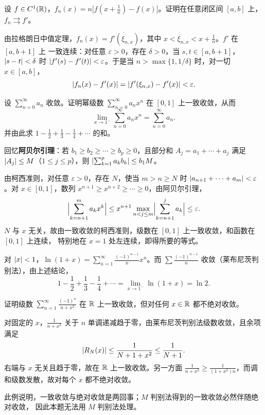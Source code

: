 \documentclass{mojing-exercise}
\begin{document}
\begin{problem}[difficulty=2, space=4.5cm]
设 $f\in C^1(\R)$，$f_n(x)=n\bigl[f(x+\tfrac1n)-f(x)\bigr]$。证明在任意闭区间 $[a,b]$ 上，
$f_n\rightrightarrows f'$。
\end{problem}

\begin{solution}
由拉格朗日中值定理，$f_n(x)=f'(\xi_{n,x})$，其中 $x<\xi_{n,x}<x+\frac1n$。$f'$ 在 $[a,b+1]$ 上
一致连续：对任意 $\varepsilon>0$，存在 $\delta>0$，当 $s,t\in[a,b+1]$，$\abs{s-t}<\delta$ 时
$\abs{f'(s)-f'(t)}<\varepsilon$。于是当 $n>\max\{1,1/\delta\}$ 时，对一切 $x\in[a,b]$，
\[
  \abs{f_n(x)-f'(x)}=\abs{f'(\xi_{n,x})-f'(x)}<\varepsilon .
\]
\end{solution}

\begin{problem}[difficulty=3, title=阿贝尔第二定理, space=6cm]
设 $\sum_{n=0}^{\infty}a_n$ 收敛。证明幂级数 $\sum_{n=0}^{\infty}a_nx^n$ 在 $[0,1]$ 上一致收敛，从而
\[
  \lim_{x\to1^-}\sum_{n=0}^{\infty}a_nx^n=\sum_{n=0}^{\infty}a_n .
\]
并由此求 $1-\frac12+\frac13-\frac14+\dotsb$ 的和。
\end{problem}

\begin{solution}
回忆\textbf{阿贝尔引理}：若 $b_1\ge b_2\ge\dotsb\ge b_p\ge0$，且部分和
$A_j=a_1+\dotsb+a_j$ 满足 $\abs{A_j}\le M$（$1\le j\le p$），则 $\abs{\sum_{k=1}^pa_kb_k}\le b_1M$。

由柯西准则，对任意 $\varepsilon>0$，存在 $N$，使当 $m>n\ge N$ 时
$\abs{a_{n+1}+\dotsb+a_m}<\varepsilon$。对 $x\in[0,1]$，数列 $x^{n+1}\ge x^{n+2}\ge\dotsb\ge0$，由阿贝尔引理，
\[
  \abs[\Big]{\sum_{k=n+1}^{m}a_kx^k}\le x^{n+1}\max_{n<j\le m}\abs[\Big]{\sum_{k=n+1}^{j}a_k}
  \le\varepsilon .
\]
$N$ 与 $x$ 无关，故由一致收敛的柯西准则，级数在 $[0,1]$ 上一致收敛，和函数在 $[0,1]$ 上连续，
特别地在 $x=1$ 处左连续，即得所要的等式。

对 $\abs{x}<1$，$\ln(1+x)=\sum_{n=1}^{\infty}\frac{(-1)^{n-1}}{n}x^n$。而
$\sum\frac{(-1)^{n-1}}{n}$ 收敛（莱布尼茨判别法），由上述结论，
\[
  1-\frac12+\frac13-\frac14+\dotsb=\lim_{x\to1^-}\ln(1+x)=\ln2 .
\]
\end{solution}

\begin{problem}[difficulty=2, space=4cm]
证明级数 $\displaystyle\sum_{n=1}^{\infty}\frac{(-1)^n}{n+x^2}$ 在 $\R$ 上一致收敛，但对任何
$x\in\R$ 都不绝对收敛。
\end{problem}

\begin{solution}
对固定的 $x$，$\frac{1}{n+x^2}$ 关于 $n$ 单调递减趋于零，由莱布尼茨判别法级数收敛，且余项满足
\[
  \abs{R_N(x)}\le\frac{1}{N+1+x^2}\le\frac{1}{N+1}.
\]
右端与 $x$ 无关且趋于零，故在 $\R$ 上一致收敛。另一方面
$\frac{1}{n+x^2}\ge\frac{1}{(1+x^2)n}$，而调和级数发散，故对每个 $x$ 都不绝对收敛。
\begin{note}
此例说明，一致收敛与绝对收敛是两回事；$M$ 判别法得到的一致收敛必然伴随绝对收敛，
因此本题无法用 $M$ 判别法处理。
\end{note}
\end{solution}

\printsolutions
\end{document}

